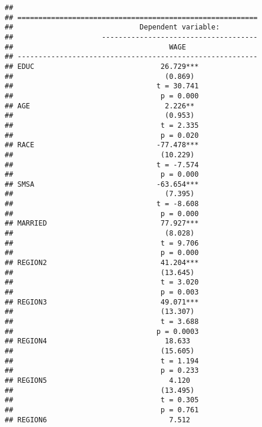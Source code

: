 \documentclass[
]{article}
\begin{document}
\begin{verbatim}
## 
## =========================================================
##                              Dependent variable:         
##                     -------------------------------------
##                                     WAGE                 
## ---------------------------------------------------------
## EDUC                              26.729***              
##                                    (0.869)               
##                                  t = 30.741              
##                                   p = 0.000              
## AGE                                2.226**               
##                                    (0.953)               
##                                   t = 2.335              
##                                   p = 0.020              
## RACE                             -77.478***              
##                                   (10.229)               
##                                  t = -7.574              
##                                   p = 0.000              
## SMSA                             -63.654***              
##                                    (7.395)               
##                                  t = -8.608              
##                                   p = 0.000              
## MARRIED                           77.927***              
##                                    (8.028)               
##                                   t = 9.706              
##                                   p = 0.000              
## REGION2                           41.204***              
##                                   (13.645)               
##                                   t = 3.020              
##                                   p = 0.003              
## REGION3                           49.071***              
##                                   (13.307)               
##                                   t = 3.688              
##                                  p = 0.0003              
## REGION4                            18.633                
##                                   (15.605)               
##                                   t = 1.194              
##                                   p = 0.233              
## REGION5                             4.120                
##                                   (13.495)               
##                                   t = 0.305              
##                                   p = 0.761              
## REGION6                             7.512                

\end{verbatim}
\end{document}
